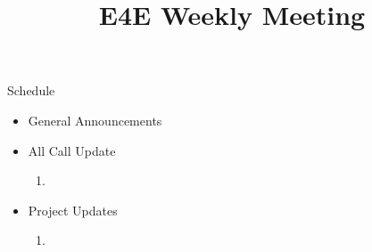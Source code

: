 \documentclass[aspectratio=169]{beamer}
\title{E4E Weekly Meeting}
\institute{UC San Diego}
\begin{document}
\maketitle
\begin{frame}{Schedule}
    \begin{itemize}
        \item General Announcements
        \item All Call Update
        \begin{enumerate}
            \item 
        \end{enumerate}
        \item Project Updates
        \begin{enumerate}
            \item 
        \end{enumerate}
    \end{itemize}
\end{frame}

\end{document}
